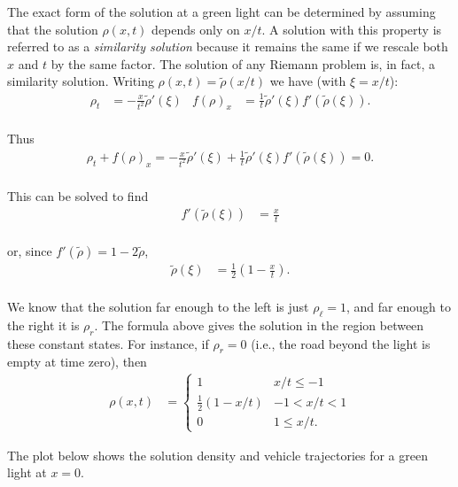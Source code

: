 \documentclass{SIAMbook2016}
\begin{document}
The exact form of the solution at a green light can be determined by
assuming that the solution \(\rho(x,t)\) depends only on \(x/t\). A
solution with this property is referred to as a \emph{similarity
solution} because it remains the same if we rescale both \(x\) and \(t\)
by the same factor. The solution of any Riemann problem is, in fact, a
similarity solution. Writing \(\rho(x,t) = \tilde{\rho}(x/t)\) we have
(with \(\xi = x/t\)):\\
\begin{align*}
    \rho_t & = -\frac{x}{t^2}\tilde{\rho}'(\xi) & f(\rho)_x & = \frac{1}{t}\tilde{\rho}'(\xi) f'(\tilde{\rho}(\xi)).
\end{align*}\\
Thus\\
\begin{align}
    \rho_t + f(\rho)_x = -\frac{x}{t^2}\tilde{\rho}'(\xi) + \frac{1}{t}\tilde{\rho}'(\xi) f'(\tilde{\rho}(\xi)) = 0.
\end{align}\\
This can be solved to find \begin{align}
    f'(\tilde{\rho}(\xi)) & = \frac{x}{t}
\end{align}\\
or, since \(f'(\tilde{\rho}) = 1-2\tilde{\rho}\),\\
\begin{align}
    \tilde{\rho}(\xi) & = \frac{1}{2}\left(1 - \frac{x}{t}\right).
\end{align}\\
We know that the solution far enough to the left is just
\(\rho_\ell=1\), and far enough to the right it is \(\rho_r\). The
formula above gives the solution in the region between these constant
states. For instance, if \(\rho_r=0\) (i.e., the road beyond the light
is empty at time zero), then\\
\begin{align}
\rho(x,t) & = \begin{cases}
                1 & x/t \le -1 \\
                \frac{1}{2}\left(1 - x/t\right) & -1 < x/t < 1 \\
                0 & 1 \le x/t.
            \end{cases}
\end{align}

The plot below shows the solution density and vehicle trajectories for a
green light at \(x=0\).
\end{document}
